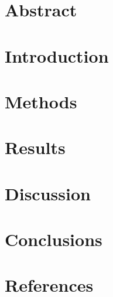 \documentclass[12pt]{article}
\begin{document}

\restoregeometry

\setcounter{tocdepth}{5}
\tableofcontents
\pagebreak

\section*{Abstract}


\section{Introduction}


\section{Methods}


\section{Results}


\section{Discussion}


\section{Conclusions}



\section{References}
\label{sec:ref}
\printbibliography[heading=none]
\end{document}
